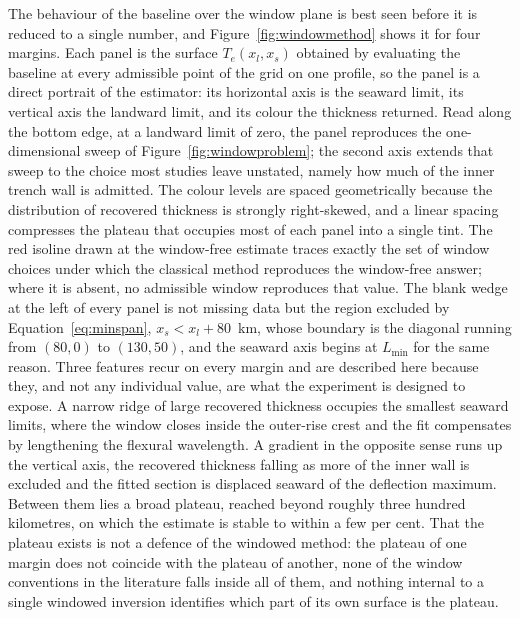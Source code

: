 \documentclass[final]{agujournal2019}
\begin{document}
The behaviour of the baseline over the window plane is best seen before it is
reduced to a single number, and Figure~\ref{fig:windowmethod} shows it for four
margins. Each panel is the surface $T_{e}(x_{l}, x_{s})$ obtained by evaluating
the baseline at every admissible point of the grid on one profile, so the panel
is a direct portrait of the estimator: its horizontal axis is the seaward limit,
its vertical axis the landward limit, and its colour the thickness returned.
Read along the bottom edge, at a landward limit of zero, the panel reproduces the
one-dimensional sweep of Figure~\ref{fig:windowproblem}; the second axis extends
that sweep to the choice most studies leave unstated, namely how much of the
inner trench wall is admitted. The colour levels are spaced geometrically because the distribution of
recovered thickness is strongly right-skewed, and a linear spacing compresses
the plateau that occupies most of each panel into a single tint. The red
isoline drawn at the window-free estimate traces exactly the set of window
choices under which the classical method reproduces the window-free answer;
where it is absent, no admissible window reproduces that value. The blank wedge
at the left of every panel is not missing data but the region excluded by
Equation~\eqref{eq:minspan}, $x_{s} < x_{l} + 80$~km, whose boundary is the
diagonal running from $(80, 0)$ to $(130, 50)$, and the seaward axis begins at
$L_{\min}$ for the same reason. Three features recur on every margin and are
described here because they, and not any individual value, are what the
experiment is designed to expose. A narrow ridge of large recovered thickness
occupies the smallest seaward limits, where the window closes inside the
outer-rise crest and the fit compensates by lengthening the flexural wavelength.
A gradient in the opposite sense runs up the vertical axis, the recovered
thickness falling as more of the inner wall is excluded and the fitted section
is displaced seaward of the deflection maximum. Between them lies a broad
plateau, reached beyond roughly three hundred kilometres, on which the estimate
is stable to within a few per cent. That the plateau exists is not a defence of
the windowed method: the plateau of one margin does not coincide with the
plateau of another, none of the window conventions in the literature falls
inside all of them, and nothing internal to a single windowed inversion
identifies which part of its own surface is the plateau.
\end{document}
